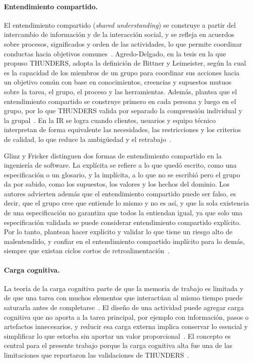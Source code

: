 \documentclass[12pt,letterpaper,oneside]{report}
\begin{document}
\paragraph{Entendimiento compartido.}
\label{sec:entendimiento}
El entendimiento compartido (\textit{shared understanding}) se construye a
partir del intercambio de información y de la interacción social, y se refleja
en acuerdos sobre procesos, significados y orden de las actividades, lo que
permite coordinar conductas hacia objetivos comunes~\cite{bittner2014shared}.
Agredo-Delgado, en la tesis en la que propuso THUNDERS, adopta la definición de
Bittner y Leimeister, según la cual es la capacidad de los miembros de un grupo
para coordinar sus acciones hacia un objetivo común con base en conocimientos,
creencias y supuestos mutuos sobre la tarea, el grupo, el proceso y las
herramientas. Además, plantea que el entendimiento compartido se construye primero en cada
persona y luego en el grupo, por lo que THUNDERS valida por separado la
comprensión individual y la grupal~\cite{agredo2022thesis}. En la IR se logra cuando clientes, usuarios y equipo técnico interpretan de forma equivalente las necesidades, las restricciones y los criterios de calidad, lo
que reduce la ambigüedad y el retrabajo~\cite{mattmann2015quality}.

Glinz y Fricker distinguen dos formas de entendimiento compartido en la
ingeniería de software. La explícita se refiere a lo que
quedó escrito, como una especificación o un glosario, y la implícita, a lo que
no se escribió pero el grupo da por sabido, como los supuestos, los valores y
los hechos del dominio. Los autores advierten además que el entendimiento compartido puede
ser falso, es decir, que el grupo cree que entiende lo mismo y no es así, y que
la sola existencia de una especificación no garantiza que todos la entiendan
igual, ya que solo una especificación validada se puede considerar
entendimiento compartido explícito. Por lo tanto, plantean hacer explícito y
validar lo que tiene un riesgo alto de malentendido, y confiar en el
entendimiento compartido implícito para lo demás, siempre que existan ciclos cortos de
retroalimentación~\cite{glinz2015shared}.

\paragraph{Carga cognitiva.}
La teoría de la carga cognitiva parte de que la memoria de trabajo es limitada y
de que una tarea con muchos elementos que interactúan al mismo tiempo puede
saturarla antes de completarse~\cite{sweller1988}. El diseño de una actividad
puede agregar carga cognitiva que no aporta a la tarea principal, por ejemplo con
información, pasos o artefactos innecesarios, y reducir esa carga externa
implica conservar lo esencial y simplificar lo que estorba sin aportar un valor
proporcional~\cite{dejong2010}. El concepto es central para el presente trabajo porque la carga cognitiva alta
fue una de las limitaciones que reportaron las validaciones de
THUNDERS~\cite{agredo2022exploratory}.
\end{document}
